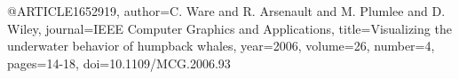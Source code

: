 @ARTICLE{1652919,
  author={C. {Ware} and R. {Arsenault} and M. {Plumlee} and D. {Wiley}},
  journal={IEEE Computer Graphics and Applications}, 
  title={Visualizing the underwater behavior of humpback whales}, 
  year={2006},
  volume={26},
  number={4},
  pages={14-18},
  doi={10.1109/MCG.2006.93}}